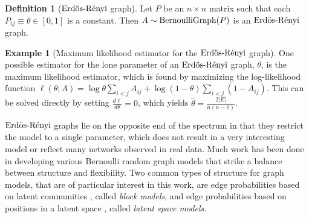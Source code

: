 \documentclass[
  11pt,
]{article}
\theoremstyle{definition}
\newtheorem{definition}{Definition}[section]
\theoremstyle{definition}
\newtheorem{example}{Example}[section]
\theoremstyle{definition}
\theoremstyle{definition}
\theoremstyle{remark}
\begin{document}
\begin{definition}[$\text{Erd\"{o}s-R\'{e}nyi}$ graph]
\label{def:erdos-renyi}
Let $P$ be an $n \times n$ matrix such that each $P_{ij} \equiv \theta \in [0, 1]$ is a constant. 
Then $A \sim \mathrm{BernoulliGraph}(P)$ is an $\text{Erd\"{o}s-R\'{e}nyi}$ graph. 
\end{definition}

\begin{example}[Maximum likelihood estimator for the $\text{Erd\"{o}s-R\'{e}nyi}$ graph]
One possible estimator for the lone parameter of an $\text{Erd\"{o}s-R\'{e}nyi}$ graph, $\theta$, is the maximum likelihood estimator, which is found by maximizing the log-likelihood function $\ell(\theta; A) = \log \theta \sum\limits_{i < j} A_{ij} + \log (1 - \theta) \sum\limits_{i < j} (1 - A_{ij})$. 
This can be solved directly by setting $\frac{d \ell}{d \theta} = 0$, which yields $\hat{\theta} = \frac{2 |E|}{n (n-1)}$.
\end{example}

\(\text{Erd\"{o}s-R\'{e}nyi}\) graphs lie on the opposite end of the spectrum in that they restrict the model to a single parameter, which does not result in a very interesting model or reflect many networks observed in real data.
Much work has been done in developing various Bernoulli random graph models that strike a balance between structure and flexibility.
Two common types of structure for graph models, that are of particular interest in this work, are edge probabilities based on latent communities \citep{doi:10.1080/0022250X.1971.9989788, NIPS2008_3578, Karrer_2011, 307cbeb9b1be48299388437423d94bf1}, called \emph{block models}, and edge probabilities based on positions in a latent space \citep{10.1007/978-3-540-77004-6_11, rubindelanchy2017statistical}, called \emph{latent space models}.
\end{document}
